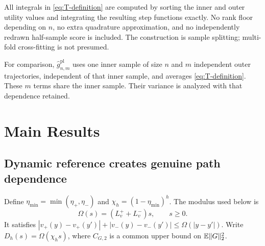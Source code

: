 \documentclass[11pt]{article}
\newcommand{\E}{\mathbb E}
\newcommand{\1}{\mathbf 1}
\DeclarePairedDelimiter{\norm}{\lVert}{\rVert}
\newcommand{\pl}{\mathrm{pl}}
\begin{document}
All integrals in \eqref{eq:T-definition} are computed by sorting the inner and outer utility values and integrating the resulting step functions exactly. No rank floor depending on $n$, no extra quadrature approximation, and no independently redrawn half-sample score is included. The construction is sample splitting; multi-fold cross-fitting is not presumed.

For comparison, $\widehat g_{n,m}^{\pl}$ uses one inner sample of size $n$ and $m$ independent outer trajectories, independent of that inner sample, and averages \eqref{eq:T-definition}. These $m$ terms share the inner sample. Their variance is analyzed with that dependence retained.

\section{Main Results}\label{sec:results}
\subsection{Dynamic reference creates genuine path dependence}
Define $\eta_{\min}=\min(\eta_+,\eta_-)$ and $\chi_h=(1-\eta_{\min})^h$. The modulus used below is
\begin{equation}\label{eq:value-modulus}
 \Omega(s)=(L_v^++L_v^-)s,\qquad s\ge0.
\end{equation}
It satisfies $|v_+(y)-v_+(y')|+|v_-(y)-v_-(y')|\le\Omega(|y-y'|)$. Write $D_h(s)=\Omega(\chi_h s)$, where $C_{G,2}$ is a common upper bound on $\E\norm{G}_2^2$.
\end{document}
